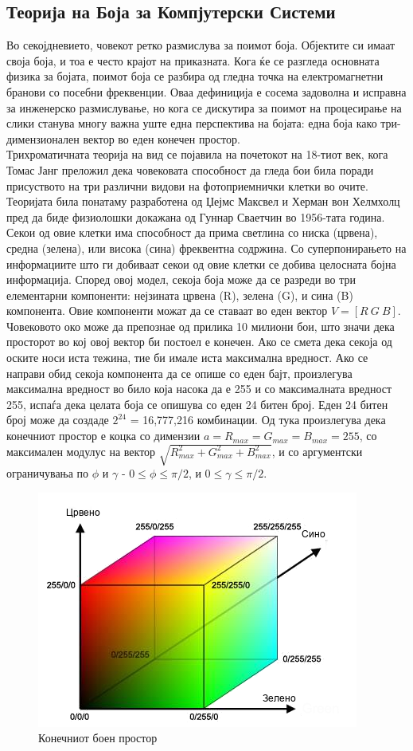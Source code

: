 \documentclass[12pt]{article}
\begin{document}
  \subsection{Теорија на Боја за Компјутерски Системи}
    \label{sec:colour_theory}
    Во секојдневието, човекот ретко размислува за поимот боја. Објектите си имаат своја боја, и тоа е често крајот на приказната. Кога ќе се разгледа основната физика за бојата, поимот боја се разбира од гледна точка на електромагнетни бранови со посебни фреквенции. Оваа дефиниција е сосема задоволна и исправна за инженерско размислување, но кога се дискутира за поимот на процесирање на слики станува многу важна уште една перспектива на бојата: една боја како три-димензионален вектор во еден конечен простор.
    \\
    Трихроматичната теорија на вид се појавила на почетокот на 18-тиот век, кога Томас Јанг преложил дека човековата способност да гледа бои била поради присуството на три различни видови на фотоприемнички клетки во очите. Теоријата била понатаму разработена од Џејмс Максвел и Херман вон Хелмхолц пред да биде физиолошки докажана од Гуннар Сваетчин во 1956-тата година.
    \bigbreak
    Секои од овие клетки има способност да прима светлина со ниска (црвена), средна (зелена), или висока (сина) фреквентна содржина. Со суперпонирањето на информациите што ги добиваат секои од овие клетки се добива целосната бојна информација. Според овој модел, секоја боја може да се разреди во три елементарни компоненти: нејзината црвена (R), зелена (G), и сина (B) компонента. Овие компоненти можат да се ставаат во еден вектор $ V = [R\ G\ B]$. Човековото око може да препознае од прилика 10 милиони бои, што значи дека просторот во кој овој вектор би постоел е конечен. Ако се смета дека секоја од оските носи иста тежина, тие би имале иста максимална вредност. Ако се направи обид секоја компонента да се опише со еден бајт, произлегува максимална вредност во било која насока да е 255 и со максималната вредност 255, испаѓа дека целата боја се опишува со еден 24 битен број. Еден 24 битен број може да создаде $2^{24}$ = 16,777,216 комбинации. Од тука произлегува дека конечниот простор е коцка со димензии $a = R_{max} = G_{max} = B_{max} = 255 $, со максимален модулус на вектор $\sqrt{R_{max}^2 + G_{max}^2 + B_{max}^2}$, и со аргументски ограничувања по $\phi$ и $\gamma$ - $0 \leq \phi \leq \pi /2$, и $0 \leq \gamma \leq \pi /2$.

    \begin{figure}[h]
      \label{fig:colour_cube_mk.png}
      \centering
      \includegraphics[width = 0.6\linewidth]{./images/colour_cube_mk.png}
      \caption{Конечниот боен простор}
      \end{figure}
\end{document}
